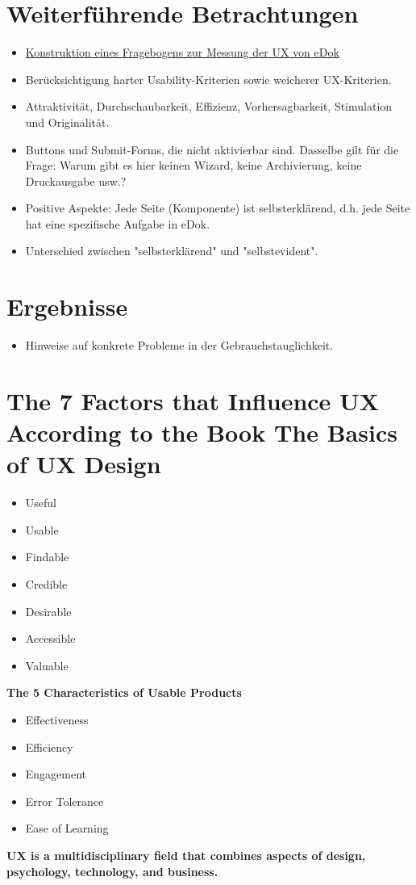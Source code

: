 \documentclass[a4paper,12pt]{report}
\begin{document}
\chapter{Weiterführende Betrachtungen}
\begin{itemize}
    \item \href{https://dl.gi.de/server/api/core/bitstreams/be764ccf-d6c1-45a3-9d7d-00ad897aff3b/content}{Konstruktion eines Fragebogens zur Messung der UX von eDok}
    \item Berücksichtigung harter Usability-Kriterien sowie weicherer UX-Kriterien.
    \item Attraktivität, Durchschaubarkeit, Effizienz, Vorhersagbarkeit, Stimulation und Originalität.
    \item Buttons und Submit-Forms, die nicht aktivierbar sind. Dasselbe gilt für die Frage: Warum gibt es hier keinen Wizard, keine Archivierung, keine Druckausgabe usw.?
    \item Positive Aspekte: Jede Seite (Komponente) ist selbsterklärend, d.h. jede Seite hat eine spezifische Aufgabe in eDok.
    \item Unterschied zwischen "selbsterklärend" und "selbstevident".
\end{itemize}

\chapter{Ergebnisse}
\begin{itemize}
    \item Hinweise auf konkrete Probleme in der Gebrauchstauglichkeit.
\end{itemize}

\chapter{The 7 Factors that Influence UX According to the Book The Basics of UX Design}
\begin{itemize}
    \item Useful
    \item Usable
    \item Findable
    \item Credible
    \item Desirable
    \item Accessible
    \item Valuable
\end{itemize}

\textbf{The 5 Characteristics of Usable Products}
\begin{itemize}
    \item Effectiveness
    \item Efficiency
    \item Engagement
    \item Error Tolerance
    \item Ease of Learning \parencite{Schmidt2021}
\end{itemize}

\textbf{UX is a multidisciplinary field that combines aspects of design, psychology, technology, and business.} \cite{Mueller2020}

\printbibliography
\end{document}
